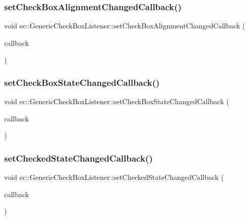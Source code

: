 \subsubsection{\texorpdfstring{set\+Check\+Box\+Alignment\+Changed\+Callback()}{setCheckBoxAlignmentChangedCallback()}}
{\footnotesize\ttfamily void ec\+::\+Generic\+Check\+Box\+Listener\+::set\+Check\+Box\+Alignment\+Changed\+Callback (\begin{DoxyParamCaption}\item[{const \mbox{\hyperlink{classec_1_1_generic_check_box_listener_a9b20541580dce7b3a1818b62524d2c6a}{Check\+Box\+Alignment\+Changed\+\_\+\+Callback}} \&}]{callback }\end{DoxyParamCaption})}

\mbox{\label{classec_1_1_generic_check_box_listener_a9d2de6f4631eaf893dfd06fa5c760cd6}} 
\subsubsection{\texorpdfstring{set\+Check\+Box\+State\+Changed\+Callback()}{setCheckBoxStateChangedCallback()}}
{\footnotesize\ttfamily void ec\+::\+Generic\+Check\+Box\+Listener\+::set\+Check\+Box\+State\+Changed\+Callback (\begin{DoxyParamCaption}\item[{const \mbox{\hyperlink{classec_1_1_generic_check_box_listener_a2737c54ec6c92a1bebda7961c6bb1852}{Check\+Box\+State\+Changed\+\_\+\+Callback}} \&}]{callback }\end{DoxyParamCaption})}

\mbox{\label{classec_1_1_generic_check_box_listener_afb6cb5cadc991ce2d90151c0241dbcb4}} 
\subsubsection{\texorpdfstring{set\+Checked\+State\+Changed\+Callback()}{setCheckedStateChangedCallback()}}
{\footnotesize\ttfamily void ec\+::\+Generic\+Check\+Box\+Listener\+::set\+Checked\+State\+Changed\+Callback (\begin{DoxyParamCaption}\item[{const \mbox{\hyperlink{classec_1_1_generic_check_box_listener_ad1cc68469820c8bb79f278f70a8dfbe4}{Checked\+State\+Changed\+\_\+\+Callback}} \&}]{callback }\end{DoxyParamCaption})}

